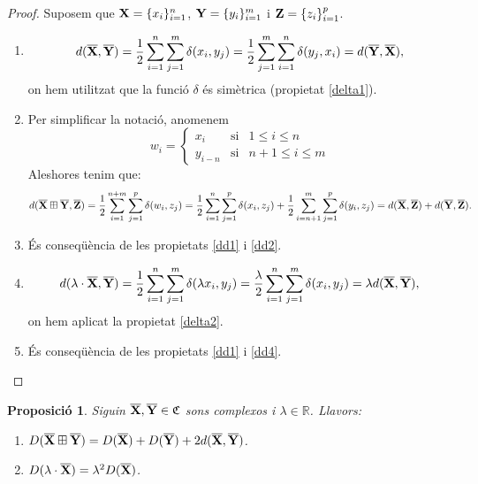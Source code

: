 \documentclass{article}
\theoremstyle{math}
\newtheorem{prop}[definition]{Proposició}
\newcommand{\0}{\ensuremath{\vb{0}}}
\newcommand{\X}{\ensuremath{\vb{X}}}
\newcommand{\Y}{\ensuremath{\vb{Y}}}
\newcommand{\Z}{\ensuremath{\vb{Z}}}
\newcommand{\RR}{\ensuremath{\mathbb{R}}} %
\begin{document}
\begin{proof}
    Suposem que $\X=\{x_i\}_{i=1}^n$, $\Y=\{y_i\}_{i=1}^m$ i $\Z=\{z_i\}_{i=1}^p$.
    \begin{enumerate}[label=$d$\arabic*)]
        \item $$d(\overline{\X},\overline{\Y})=\frac{1}{2}\sum_{i=1}^n\sum_{j=1}^m\delta(x_i,y_j)=\frac{1}{2}\sum_{j=1}^m\sum_{i=1}^n\delta(y_j,x_i)=d(\overline{\Y},\overline{\X}),$$ on hem utilitzat que la funció $\delta$ és simètrica (propietat \ref{delta1}).
        \item Per simplificar la notació, anomenem 
        $$
        w_i=\left\{
        \begin{array}{ccc}
            x_i & \text{si} & 1\leq i\leq n\\
            y_{i-n} & \text{si} & n+1\leq i\leq m
        \end{array}\right.
        $$ Aleshores tenim que: $$d(\overline{\X}\boxplus\overline{\Y},\overline{\Z})=\frac{1}{2}\sum_{i=1}^{n+m}\sum_{j=1}^p\delta(w_i,z_j)=\frac{1}{2}\sum_{i=1}^n\sum_{j=1}^p\delta(x_i,z_j)+\frac{1}{2}\sum_{i=n+1}^m\sum_{j=1}^p\delta(y_i,z_j)=d(\overline{\X},\overline{\Z})+d(\overline{\Y},\overline{\Z}).$$
        \item És conseqüència de les propietats \ref{dd1} i \ref{dd2}.
        \item $$d(\lambda\cdot\overline{\X},\overline{\Y})=\frac{1}{2}\sum_{i=1}^n\sum_{j=1}^m\delta(\lambda x_i,y_j)=\frac{\lambda}{2}\sum_{i=1}^n\sum_{j=1}^m\delta(x_i,y_j)=\lambda d(\overline{\X},\overline{\Y}),$$ on hem aplicat la propietat \ref{delta2}.
        \item És conseqüència de les propietats \ref{dd1} i \ref{dd4}.
    \end{enumerate}
\end{proof}
\begin{prop}
    Siguin $\overline{\X},\overline{\Y}\in\mathfrak{C}$ sons complexos i $\lambda\in\RR$. Llavors:
    \begin{enumerate}[label=$D$\arabic*),ref=$D$\arabic*]
        \item\label{DD1} $D(\overline{\X}\boxplus\overline{\Y})=D(\overline{\X})+D(\overline{\Y})+2d(\overline{\X},\overline{\Y})$.
        \item\label{DD2} $D(\lambda\cdot \overline{\X})=\lambda^2D(\overline{\X})$.
    \end{enumerate}
\end{prop}
\end{document}
